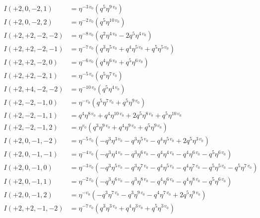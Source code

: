 \documentclass{article}
\begin{document}
\begin{align*}
I(+2, 0, -2, 1) &= \eta^{-3 \, v_{0}} \left( q^{5} \eta^{9 \, v_{0}} \right) \\
I(+2, 0, -2, 2) &= \eta^{-2 \, v_{0}} \left( q^{5} \eta^{10 \, v_{0}} \right) \\
I(+2, +2, -2, -2) &= \eta^{-8 \, v_{0}} \left( q^{2} \eta^{4 \, v_{0}} - 2 q^{5} \eta^{4 \, v_{0}} \right) \\
I(+2, +2, -2, -1) &= \eta^{-7 \, v_{0}} \left( q^{3} \eta^{5 \, v_{0}} + q^{4} \eta^{5 \, v_{0}} + q^{5} \eta^{5 \, v_{0}} \right) \\
I(+2, +2, -2, 0) &= \eta^{-6 \, v_{0}} \left( q^{4} \eta^{6 \, v_{0}} + q^{5} \eta^{6 \, v_{0}} \right) \\
I(+2, +2, -2, 1) &= \eta^{-5 \, v_{0}} \left( q^{5} \eta^{7 \, v_{0}} \right) \\
I(+2, +4, -2, -2) &= \eta^{-10 \, v_{0}} \left( q^{5} \eta^{4 \, v_{0}} \right) \\
I(+2, -2, -1, 0) &= \eta^{-v_{0}} \left( q^{5} \eta^{7 \, v_{0}} + q^{5} \eta^{9 \, v_{0}} \right) \\
I(+2, -2, -1, 1) &= q^{4} \eta^{8 \, v_{0}} + q^{4} \eta^{10 \, v_{0}} + 2 q^{5} \eta^{8 \, v_{0}} + q^{5} \eta^{10 \, v_{0}} \\
I(+2, -2, -1, 2) &= \eta^{v_{0}} \left( q^{3} \eta^{9 \, v_{0}} + q^{4} \eta^{9 \, v_{0}} + q^{5} \eta^{9 \, v_{0}} \right) \\
I(+2, 0, -1, -2) &= \eta^{-5 \, v_{0}} \left( -q^{3} \eta^{3 \, v_{0}} - q^{3} \eta^{5 \, v_{0}} - q^{4} \eta^{5 \, v_{0}} + 2 q^{5} \eta^{3 \, v_{0}} \right) \\
I(+2, 0, -1, -1) &= \eta^{-4 \, v_{0}} \left( -q^{3} \eta^{4 \, v_{0}} - q^{3} \eta^{6 \, v_{0}} - q^{4} \eta^{4 \, v_{0}} - q^{4} \eta^{6 \, v_{0}} - q^{5} \eta^{6 \, v_{0}} \right) \\
I(+2, 0, -1, 0) &= \eta^{-3 \, v_{0}} \left( -q^{3} \eta^{5 \, v_{0}} - q^{3} \eta^{7 \, v_{0}} - q^{4} \eta^{5 \, v_{0}} - q^{4} \eta^{7 \, v_{0}} - q^{5} \eta^{5 \, v_{0}} - q^{5} \eta^{7 \, v_{0}} \right) \\
I(+2, 0, -1, 1) &= \eta^{-2 \, v_{0}} \left( -q^{3} \eta^{6 \, v_{0}} - q^{3} \eta^{8 \, v_{0}} - q^{4} \eta^{6 \, v_{0}} - q^{4} \eta^{8 \, v_{0}} - q^{5} \eta^{6 \, v_{0}} \right) \\
I(+2, 0, -1, 2) &= \eta^{-v_{0}} \left( -q^{3} \eta^{7 \, v_{0}} - q^{3} \eta^{9 \, v_{0}} - q^{4} \eta^{7 \, v_{0}} + 2 q^{5} \eta^{9 \, v_{0}} \right) \\
I(+2, +2, -1, -2) &= \eta^{-7 \, v_{0}} \left( q^{3} \eta^{3 \, v_{0}} + q^{4} \eta^{3 \, v_{0}} + q^{5} \eta^{3 \, v_{0}} \right) \\

\end{align*}
\end{document}
